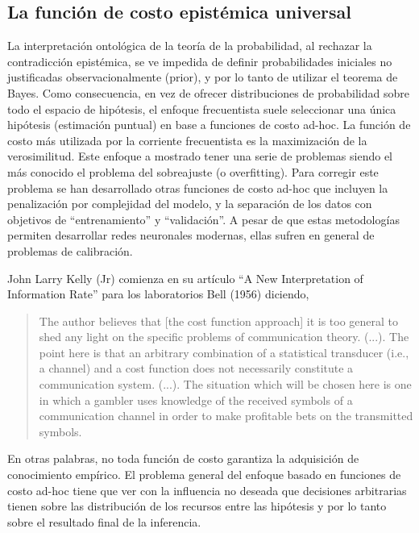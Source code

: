 \documentclass[a4paper,10pt]{book}
\theoremstyle{definition}
\begin{document}
\subsection{La función de costo epistémica universal}

% 

La interpretación ontológica de la teoría de la probabilidad, al rechazar la contradicción epistémica, se ve impedida de definir probabilidades iniciales no justificadas observacionalmente (prior), y por lo tanto de utilizar el teorema de Bayes.
%
Como consecuencia, en vez de ofrecer distribuciones de probabilidad sobre todo el espacio de hipótesis, el enfoque frecuentista suele seleccionar una única hipótesis (estimación puntual) en base a funciones de costo ad-hoc.
%
La función de costo más utilizada por la corriente frecuentista es la maximización de la verosimilitud.
%
Este enfoque a mostrado tener una serie de problemas siendo el más conocido el problema del sobreajuste (o overfitting).
%
Para corregir este problema se han desarrollado otras funciones de costo ad-hoc que incluyen la penalización por complejidad del modelo, y la separación de los datos con objetivos de ``entrenamiento'' y ``validación''.
%
A pesar de que estas metodologías permiten desarrollar redes neuronales modernas, ellas sufren en general de problemas de calibración. 


John Larry Kelly (Jr) comienza en su artículo ``A New Interpretation of Information Rate'' para los laboratorios Bell (1956) diciendo, 
%
\begin{quotation}
The author believes that [the cost function approach] it is too general to shed any light on the specific problems of communication theory. (...). The point here is that an arbitrary combination of a statistical transducer (i.e., a channel) and a cost function does not necessarily constitute a communication system. (...). The situation which will be chosen here is one in which a gambler uses knowledge of the received symbols of a communication channel in order to make profitable bets on the transmitted symbols.
\end{quotation}
%
En otras palabras, no toda función de costo garantiza la adquisición de conocimiento empírico.
%
El problema general del enfoque basado en funciones de costo ad-hoc tiene que ver con la influencia no deseada que decisiones arbitrarias tienen sobre las distribución de los recursos entre las hipótesis y por lo tanto sobre el resultado final de la inferencia.
\end{document}
